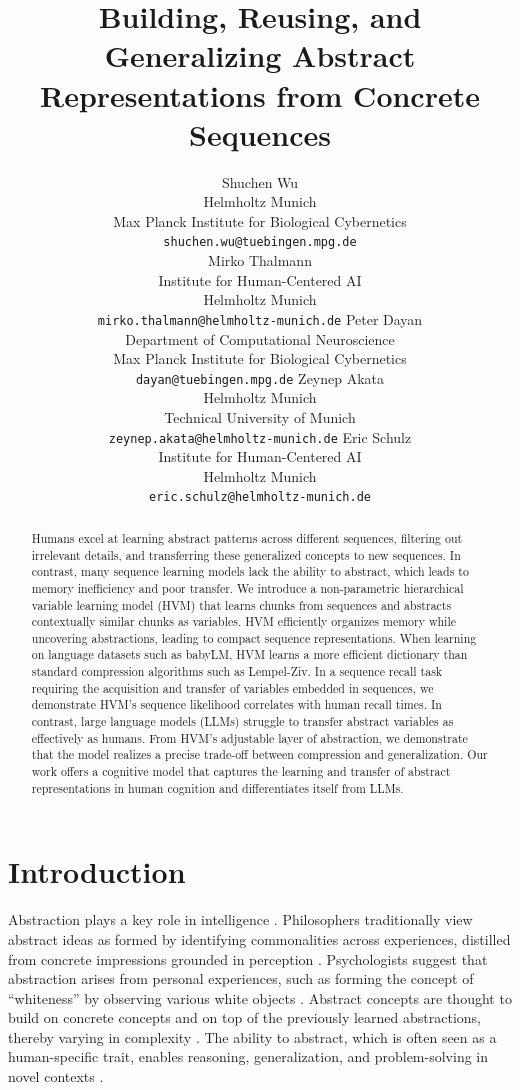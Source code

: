 \documentclass{article} %
\title{Building, Reusing, and Generalizing Abstract Representations from Concrete Sequences}
\author{Shuchen Wu \\
Helmholtz Munich \\
Max Planck Institute for Biological Cybernetics \\
\texttt{shuchen.wu@tuebingen.mpg.de} \\
\And
Mirko Thalmann \\
Institute for Human-Centered AI \\
Helmholtz Munich\\
\texttt{mirko.thalmann@helmholtz-munich.de} 
\And
Peter Dayan \\
Department of Computational Neuroscience \\
Max Planck Institute for Biological Cybernetics \\
\texttt{dayan@tuebingen.mpg.de} 
\And
Zeynep Akata \\
Helmholtz Munich \\
Technical University of Munich \\
\texttt{zeynep.akata@helmholtz-munich.de} 
\AND
Eric Schulz \\
Institute for Human-Centered AI\\
Helmholtz Munich \\
\texttt{eric.schulz@helmholtz-munich.de}
}
\theoremstyle{remark}
\begin{document}
\maketitle

\begin{abstract}
Humans excel at learning abstract patterns across different sequences, filtering out irrelevant details, and transferring these generalized concepts to new sequences.
In contrast, many sequence learning
models lack the ability to abstract, which leads to memory
inefficiency and poor transfer. We introduce a non-parametric hierarchical variable learning model (HVM) that learns chunks from sequences and abstracts contextually similar chunks as variables. HVM efficiently organizes memory while uncovering abstractions, leading to compact sequence representations.  When learning on language datasets such as babyLM, HVM learns a more efficient dictionary than standard compression algorithms such as Lempel-Ziv. In a sequence recall task requiring the acquisition and transfer of variables embedded in sequences, we demonstrate HVM's sequence likelihood correlates with human recall times. In contrast, large language models (LLMs) struggle to transfer abstract variables as effectively as humans. From HVM's adjustable layer of abstraction, we demonstrate that the model realizes a precise trade-off between compression and generalization. Our work offers a cognitive model that captures the learning and transfer of abstract representations in human cognition and differentiates itself from LLMs.
\end{abstract}



\section{Introduction}
Abstraction plays a key role in intelligence \citep{konidaris_necessity_2019}. Philosophers traditionally view abstract ideas as formed by identifying commonalities across experiences, distilled from concrete impressions grounded in perception \citep{Kant:1998, Fichte2005, Stern1977}. Psychologists suggest that abstraction arises from personal experiences, such as forming the concept of ``whiteness'' by observing various white objects \citep{yee_abstraction_2019, barsalou_1999}. Abstract concepts are thought to build on concrete concepts and on top of the previously learned abstractions, thereby varying in complexity \citep{cuccio_peircean_2018, van_oers_contextualisation_2001, CollinsQuillian1969, Piaget1964}. The ability to abstract, which is often seen as a human-specific trait, enables reasoning, generalization, and problem-solving in novel contexts \citep{ohlsson_abstraction_1997, DEHAENE2022751, duncker_problem-solving_1945}.
\end{document}
